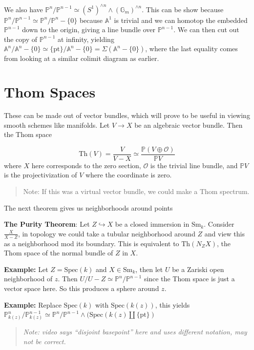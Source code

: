 \documentclass[11pt]{scrreprt}
\theoremstyle{definition}
\newcommand{\PP}[0]{{\mathbb{P}}}
\newcommand{\Af}[0]{{\mathbb{A}}}
\newcommand{\spec}[0]{{\mathrm{Spec}}}
\newcommand{\theset}[1]{\{{#1}\}}
\newcommand{\pt}[0]{\{\text{pt}\}}
\newcommand{\Sm}[0]{{\text{Sm}_k}}
\newcommand{\GG}[0]{{\mathbb{G}}}
\newcommand{\homotopic}[0]{\simeq}
\newcommand{\injects}[0]{\hookrightarrow}
\begin{document}
We also have
\(\PP^{n} / \PP^{n-1} \homotopic (S^1)^{\wedge n}\wedge (\GG_m)^{\wedge n}\).
This can be show because
\(\PP^{n} / \PP^{n-1} \homotopic \PP^n / \PP^n-\theset{0}\) because
\(\Af^1\) is trivial and we can homotop the embedded \(\PP^{n-1}\) down
to the origin, giving a line bundle over \(\PP^{n-1}\). We can then cut
out the copy of \(\PP^{n-1}\) at infinity, yielding
\(\Af^n / \Af^{n} - \theset{0} \homotopic \pt / \Af^{n} - \theset{0} = \Sigma (\Af^{n} - \theset{0})\),
where the last equality comes from looking at a similar colimit diagram
as earlier.

\hypertarget{thom-spaces}{%
\section{Thom Spaces}\label{thom-spaces}}

These can be made out of vector bundles, which will prove to be useful
in viewing smooth schemes like manifolds. Let \(V \to X\) be an
algebraic vector bundle. Then the Thom space

\[
\text{Th}(V) = \frac{V} {V-X} \homotopic \frac{\PP(V \oplus \mathcal O)}{\PP V}
\] where \(X\) here corresponds to the zero section, \(\mathcal O\) is
the trivial line bundle, and \(\PP V\) is the projectivization of \(V\)
where the coordinate is zero.

\begin{quote}
Note: If this was a virtual vector bundle, we could make a Thom
spectrum.
\end{quote}

The next theorem gives us neighborhoods around points

\textbf{The Purity Theorem}: Let \(Z \injects X\) be a closed immersion
in \(\Sm\). Consider \(\frac X {X-Z}\), in topology we could take a
tubular neighborhood around \(Z\) and view this as a neighborhood mod
its boundary. This is equivalent to \(\text{Th}(N_Z X)\), the Thom space
of the normal bundle of \(Z\) in \(X\).

\textbf{Example:} Let \(Z =\spec(k)\) and \(X \in \Sm\), then let \(U\)
be a Zariski open neighborhood of \(z\). Then
\(U/U-Z \homotopic \PP^n / \PP^{n-1}\) since the Thom space is just a
vector space here. So this produces a sphere around \(z\).

\textbf{Example:} Replace \(\spec(k)\) with \(\spec(k(z))\), this yields
\(\PP^n_{k(z)} / \PP^{n-1}_{k(z)} \homotopic \PP^n / \PP^{n-1} \wedge (\spec (k(z)\coprod \pt)\)
\begin{quote}\textit{
Note: video says ``disjoint basepoint'' here and uses
different notation, may not be correct.
}\end{quote}
\end{document}
